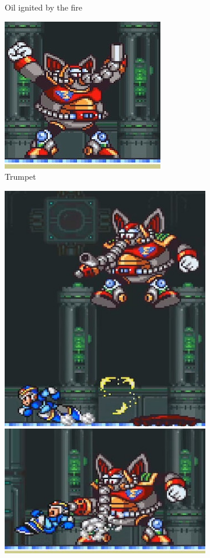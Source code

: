 \begin{figure}[htp]
\begin{subfigure}{0.5\textwidth}
		\caption{Oil ignited by the fire}
	\end{subfigure}
	\begin{subfigure}{0.3\textwidth}
		\centering
		\includegraphics[width=\linewidth]{figures/X1/Flame_mammoth/Mammoth_trunk.jpg}
		\caption{Trumpet}
	\end{subfigure}
%
	\begin{subfigure}{\textwidth}
		\centering
		\includegraphics[width=0.3\linewidth]{figures/X1/Flame_mammoth/Mammoth_press_1.jpg}
		\includegraphics[width=0.4\linewidth]{figures/X1/Flame_mammoth/Mammoth_press_2.jpg}

\end{subfigure}
\end{figure}

